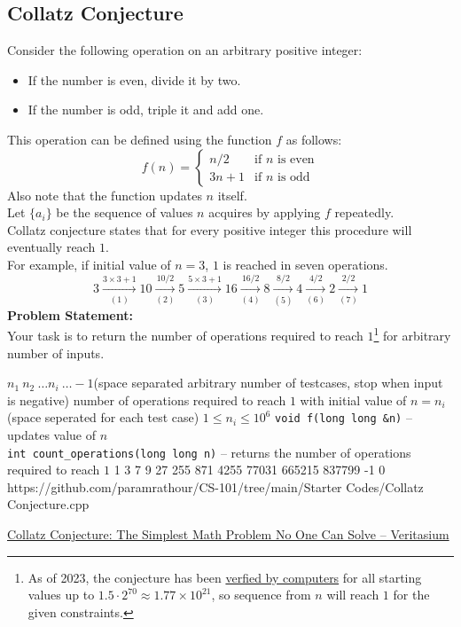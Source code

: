 \documentclass[../../Problems]{subfiles}
\begin{document}
\subsection{Collatz Conjecture}
Consider the following operation on an arbitrary positive integer:
\begin{itemize}
	\item If the number is even, divide it by two.
	\item If the number is odd, triple it and add one.
\end{itemize}
This operation can be defined using the function $f$ as follows:
\begin{equation}
f(n) = \begin{cases}
	n/2 & \text{if $n$ is even}\\
	3n+1 & \text{if $n$ is odd}
\end{cases}
\end{equation}
Also note that the function updates $n$ itself.\\
Let $\{a_i\}$ be the sequence of values $n$ acquires by applying $f$ repeatedly.\\
Collatz conjecture states that for every positive integer this procedure will eventually reach $1$.\\
For example, if initial value of $n=3$, $1$ is reached in seven operations.
\begin{equation*}
3\xrightarrow[(1)]{3\times3+1}10\xrightarrow[(2)]{10/2}5\xrightarrow[(3)]{5\times3+1}16\xrightarrow[(4)]{16/2}8\xrightarrow[(5)]{8/2}4\xrightarrow[(6)]{4/2}2\xrightarrow[(7)]{2/2}1
\end{equation*}
\textbf{Problem Statement:}\\
Your task is to return the number of operations required to reach $1$\footnote{As of 2023, the conjecture has been \href{https://www.reddit.com/r/numbertheory/comments/17mxkud}{verfied by computers} for all starting values up to $1.5\cdot2^{70} \approx 1.77 \times 10^{21}$, so sequence from $n$ will reach $1$ for the given constraints.} for arbitrary number of inputs.
\begin{testcasesFunction}
	{$n_1\ n_2\ \ldots n_i\ \ldots -1$\hfill(space separated arbitrary number of testcases, stop when input is negative)}
	{number of operations required to reach $1$ with initial value of $n = n_i$ \hfill(space seperated for each test case)}
	{$1 \leq n_i \leq 10^{6}$}
	{\texttt{void f(long long \&n)} -- updates value of $n$\\
	\texttt{int count\_operations(long long n)} -- returns the number of operations required to reach $1$}
	{1 3 7 9 27 255 871 4255 77031 665215 837799 -1}
	{0}
	{https://github.com/paramrathour/CS-101/tree/main/Starter Codes/Collatz Conjecture.cpp}
\end{testcasesFunction}
\begin{funvideo}
\href{https://youtu.be/094y1Z2wpJg}{Collatz Conjecture: The Simplest Math Problem No One Can Solve -- Veritasium}
\end{funvideo}
\end{document}

